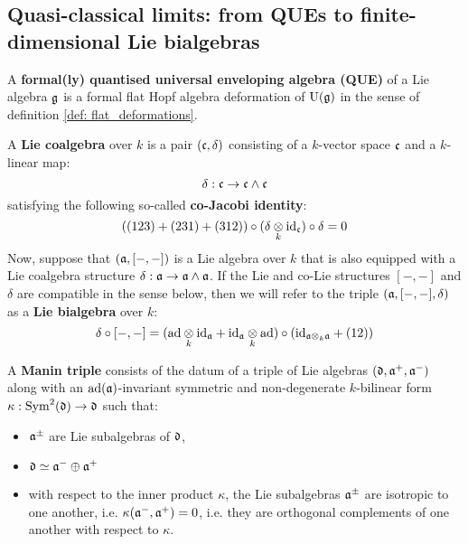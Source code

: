     \subsection{Quasi-classical limits: from QUEs to finite-dimensional Lie bialgebras}
        \begin{definition} \label{def: formal_QUEs}
            A \textbf{formal(ly) quantised universal enveloping algebra (QUE)} of a Lie algebra $\mathfrak{g}$ is a formal flat Hopf algebra deformation of $\mathrm{U}(\mathfrak{g})$ in the sense of definition \ref{def: flat_deformations}.
        \end{definition}
    
        \begin{definition} \label{def: lie_co/bialgebras}
            A \textbf{Lie coalgebra} over $k$ is a pair $(\mathfrak{c}, \delta)$ consisting of a $k$-vector space $\mathfrak{c}$ and a $k$-linear map:
                $$\delta: \mathfrak{c} \to \mathfrak{c} \wedge \mathfrak{c}$$
            satisfying the following so-called \textbf{co-Jacobi identity}:
                $$((123) + (231) + (312)) \circ (\delta \tensor_k \id_\c) \circ \delta = 0$$
            Now, suppose that $(\mathfrak{a}, [-, -])$ is a Lie algebra over $k$ that is also equipped with a Lie coalgebra structure $\delta: \mathfrak{a} \to \mathfrak{a} \wedge \mathfrak{a}$. If the Lie and co-Lie structures $[-, -]$ and $\delta$ are compatible in the sense below, then we will refer to the triple $(\mathfrak{a}, [-, -], \delta)$ as a \textbf{Lie bialgebra} over $k$:
                $$\delta \circ [-, -] = (\ad \tensor_k \id_{\a} + \id_{\a} \tensor_k \ad) \circ (\id_{\a \tensor_k \a} + (12))$$
        \end{definition}
        \begin{definition} \label{def: manin_triples}
            A \textbf{Manin triple} consists of the datum of a triple of Lie algebras $(\mathfrak{d}, \mathfrak{a}^+, \mathfrak{a}^-)$ along with an $\mathrm{ad}(\mathfrak{a})$-invariant symmetric and non-degenerate $k$-bilinear form $\kappa: \mathrm{Sym}^2(\mathfrak{d}) \to \mathfrak{d}$ such that:
                \begin{itemize}
                    \item $\mathfrak{a}^{\pm}$ are Lie subalgebras of $\mathfrak{d}$,
                    \item $\mathfrak{d} \simeq \mathfrak{a}^- \oplus \mathfrak{a}^+$
                    \item with respect to the inner product $\kappa$, the Lie subalgebras $\mathfrak{a}^{\pm}$ are isotropic to one another, i.e. $\kappa(\mathfrak{a}^-, \mathfrak{a}^+) = 0$, i.e. they are orthogonal complements of one another with respect to $\kappa$.
                \end{itemize}
        \end{definition}

